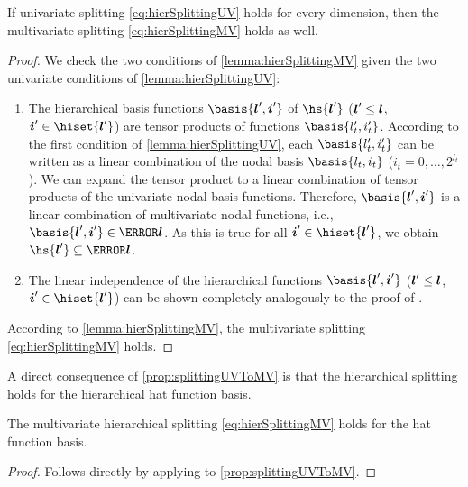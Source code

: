 \vspace*{0pt plus 1fill}

\begin{proposition}
  \label{prop:splittingUVToMV}
  If univariate splitting \eqref{eq:hierSplittingUV}
  holds for every dimension,
  then the multivariate splitting \eqref{eq:hierSplittingMV} holds as well.
\end{proposition}

\vspace*{0pt plus 0.3fill}

\begin{proof}
  We check the two conditions of \cref{lemma:hierSplittingMV}
  given the two univariate conditions of \cref{lemma:hierSplittingUV}:
  \begin{enumerate}
    \item
    The hierarchical basis functions $\basis{\*l',\*i'}$
    of $\hs{\*l'}$ (${\boldsymbol{l}}' \le {\boldsymbol{l}}$, $\*i' \in \hiset{\*l'}$)
    are tensor products of functions $\basis{l_t',i_t'}$.
    According to the first condition of \cref{lemma:hierSplittingUV},
    each $\basis{l_t',i_t'}$ can be written as a linear combination of
    the nodal basis $\basis{l_t,i_t}$ ($i_t = 0, \dotsc, 2^{l_t}$).
    We can expand the tensor product to a linear combination
    of tensor products of the univariate nodal basis functions.
    Therefore, $\basis{\*l',\*i'}$ is a linear combination of
    multivariate nodal functions, i.e., $\basis{\*l',\*i'} \in \ns{\*l}$.
    As this is true for all $\*i' \in \hiset{\*l'}$, we obtain
    $\hs{\*l'} \subset \ns{\*l}$.
    
    \item
    The linear independence of the hierarchical functions $\basis{\*l',\*i'}$
    (${\boldsymbol{l}}' \le {\boldsymbol{l}}$, $\*i' \in \hiset{\*l'}$) can be shown completely
    analogously to the proof of
    .
  \end{enumerate}
  According to \cref{lemma:hierSplittingMV},
  the multivariate splitting \eqref{eq:hierSplittingMV} holds.
\end{proof}

\vspace*{0pt plus 1fill}

A direct consequence of \cref{prop:splittingUVToMV} is that
the hierarchical splitting holds for the hierarchical hat function basis.

\pagebreak

\begin{corollary}
  \label{cor:hierSplittingHatMV}
  The multivariate hierarchical splitting \eqref{eq:hierSplittingMV}
  holds for the hat function basis.
\end{corollary}
\begin{proof}
  Follows directly by applying
   to \cref{prop:splittingUVToMV}.
\end{proof}
